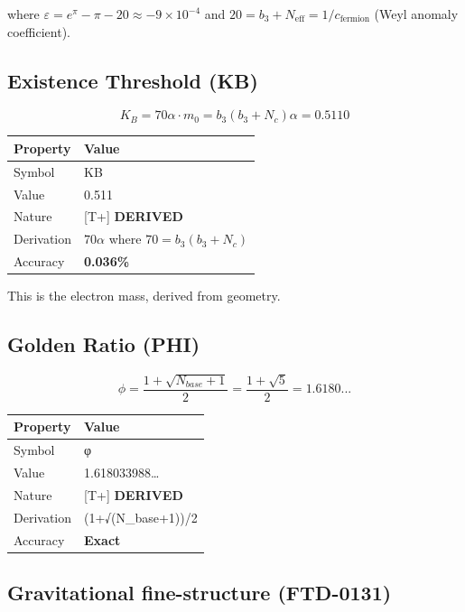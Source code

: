 \documentclass[
  11pt,
  letterpaper,
  twoside,
  openright]{book}
\begin{document}
where \(\varepsilon = e^\pi - \pi - 20 \approx -9 \times 10^{-4}\) and
\(20 = b_3 + N_{\text{eff}} = 1/c_{\text{fermion}}\) (Weyl anomaly
coefficient).

\subsection{Existence Threshold (KB)}\label{existence-threshold-kb}

\[
K_B = 70\alpha \cdot m_0 = b_3(b_3 + N_c)\alpha = 0.5110
\]

\begin{longtable}[]{@{}ll@{}}
\toprule\noalign{}
Property & Value \\
\midrule\noalign{}
\endhead
\bottomrule\noalign{}
\endlastfoot
Symbol & KB \\
Value & 0.511 \\
Nature & {[}T+{]} \textbf{DERIVED} \\
Derivation & \(70\alpha\) where \(70 = b_3(b_3+N_c)\) \\
Accuracy & \textbf{0.036\%} \\
\end{longtable}

This is the electron mass, derived from geometry.

\subsection{Golden Ratio (PHI)}\label{golden-ratio-phi}

\[
\phi = \frac{1 + \sqrt{N_{base} + 1}}{2} = \frac{1 + \sqrt{5}}{2} = 1.6180...
\]

\begin{longtable}[]{@{}ll@{}}
\toprule\noalign{}
Property & Value \\
\midrule\noalign{}
\endhead
\bottomrule\noalign{}
\endlastfoot
Symbol & φ \\
Value & 1.618033988\ldots{} \\
Nature & {[}T+{]} \textbf{DERIVED} \\
Derivation & (1+√(N\_base+1))/2 \\
Accuracy & \textbf{Exact} \\
\end{longtable}

\subsection{Gravitational fine-structure
(FTD-0131)}\label{gravitational-fine-structure-ftd-0131}
\end{document}
